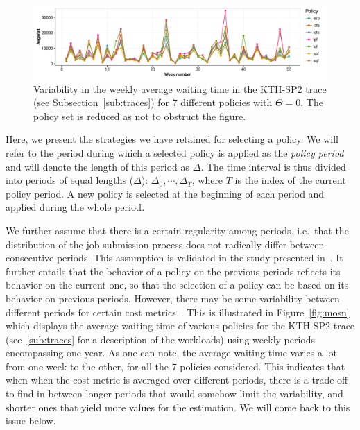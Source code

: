 \documentclass[sigconf,anonymous]{acmart}
\begin{document}
\begin{figure}[]
  \centering
  \includegraphics[scale=0.6]{figures/variability.pdf}

  \caption{Variability in the weekly average waiting time in the KTH-SP2 trace
  (see Subsection~\ref{sub:traces}) for 7 different policies with $\Theta = 0$. The policy set is
  reduced as not to obstruct the figure.}

  \label{fig:variability}
\end{figure}

Here, we present the strategies we have retained for selecting a policy. We will
refer to the period during which a selected policy is applied as the
\textit{policy period} and will denote the length of this period as $\Delta$.
The time interval is thus divided into periods of equal lengths ($\Delta$):
$\Delta_0, \cdots, \Delta_T$, where $T$ is the index of the current policy
period. A new policy is selected at the beginning of each period and applied
during the whole period.

We further assume that there is a certain regularity among periods,
i.e.\ that the distribution of the job submission process does not
radically differ between consecutive periods. This assumption is validated in
the study presented in~\cite{jsspp17}. It further entails that the behavior of
a policy on the previous periods reflects its behavior on the current one, so
that the selection of a policy can be based on its behavior on previous
periods. However, there may be some variability between different periods for
certain cost metrics~\cite{feitelson2001metrics}. This is illustrated in
Figure~\ref{fig:mosn} which displays the average waiting time of various
policies for the KTH-SP2 trace (see~\ref{sub:traces} for a description of the
workloads) using weekly periods encompassing one year. As one can note, the
average waiting time varies a lot from one week to the other, for all the 7
policies considered. This indicates that when when the cost metric is averaged
over different periods, there is a trade-off to find in between longer periods
that would somehow limit the variability, and shorter ones that yield more
values for the estimation. We will come back to this issue below.
\end{document}
